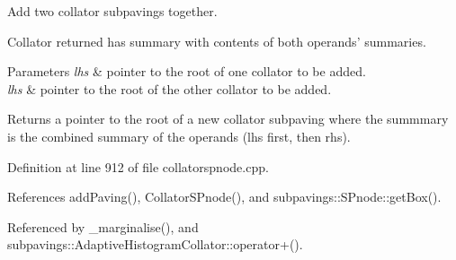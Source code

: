 \-Add two collator subpavings together. 

\-Collator returned has summary with contents of both operands' summaries.


\begin{DoxyParams}{\-Parameters}
{\em lhs} & pointer to the root of one collator to be added. \\
\hline
{\em lhs} & pointer to the root of the other collator to be added. \\
\hline
\end{DoxyParams}
\begin{DoxyReturn}{\-Returns}
a pointer to the root of a new collator subpaving where the summmary is the combined summary of the operands (lhs first, then rhs). 
\end{DoxyReturn}


\-Definition at line 912 of file collatorspnode.\-cpp.



\-References add\-Paving(), \-Collator\-S\-Pnode(), and subpavings\-::\-S\-Pnode\-::get\-Box().



\-Referenced by \-\_\-marginalise(), and subpavings\-::\-Adaptive\-Histogram\-Collator\-::operator+().


